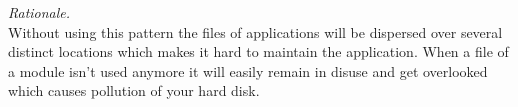  
\begin{center}
   
\end{center}

\textit{Rationale.}\\
Without using this pattern the files of applications will be dispersed over several distinct locations which makes it hard to maintain the application. When a file of a module isn't used anymore it will easily remain in disuse and get overlooked which causes pollution of your hard disk.